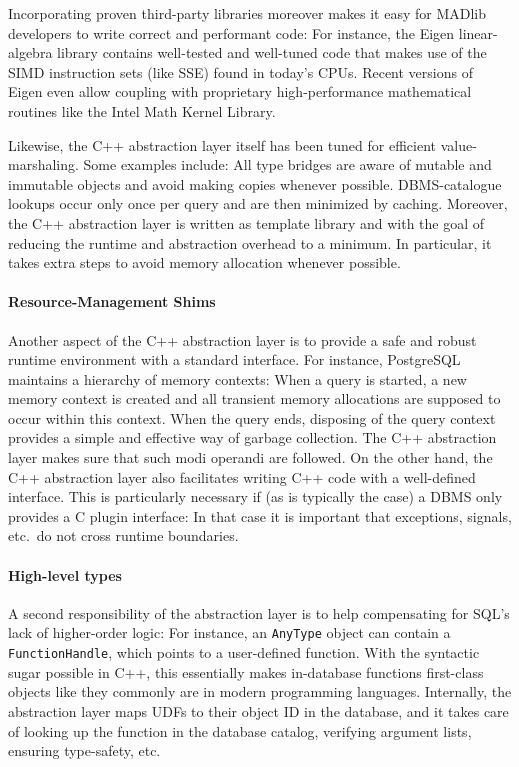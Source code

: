 Incorporating proven third-party libraries moreover makes it easy for MADlib developers to write correct and performant code: For instance, the Eigen linear-algebra library contains well-tested and well-tuned code that makes use of the SIMD instruction sets (like SSE) found in today's CPUs. Recent versions of Eigen even allow coupling with proprietary high-performance mathematical routines like the Intel Math Kernel Library.

Likewise, the C++ abstraction layer itself has been tuned for efficient value-marshaling. Some examples include: All type bridges are aware of mutable and immutable objects and avoid making copies whenever possible. DBMS-catalogue lookups occur only once per query and are then minimized by caching. Moreover, the C++ abstraction layer is written as template library and with the goal of reducing the runtime and abstraction overhead to a minimum. In particular, it takes extra steps to avoid memory allocation whenever possible.

\paragraph{Resource-Management Shims}

Another aspect of the C++ abstraction layer is to provide a safe and robust runtime environment with a standard interface. For instance, PostgreSQL maintains a hierarchy of memory contexts: When a query is started, a new memory context is created and all transient memory allocations are supposed to occur within this context. When the query ends, disposing of the query context provides a simple and effective way of garbage collection. The C++ abstraction layer makes sure that such modi operandi are followed. On the other hand, the C++ abstraction layer also facilitates writing C++ code with a well-defined interface. This is particularly necessary if (as is typically the case) a DBMS only provides a C plugin interface: In that case it is important that exceptions, signals, etc.\ do not cross runtime boundaries.

\paragraph{High-level types}

A second responsibility of the abstraction layer is to help compensating for SQL's lack of higher-order logic: For instance, an \texttt{AnyType} object can contain a \texttt{FunctionHandle}, which points to a user-defined function. With the syntactic sugar possible in C++, this essentially makes in-database functions first-class objects like they commonly are in modern programming languages. Internally, the abstraction layer maps UDFs to their object ID in the database, and it takes care of looking up the function in the database catalog, verifying argument lists, ensuring type-safety, etc.

